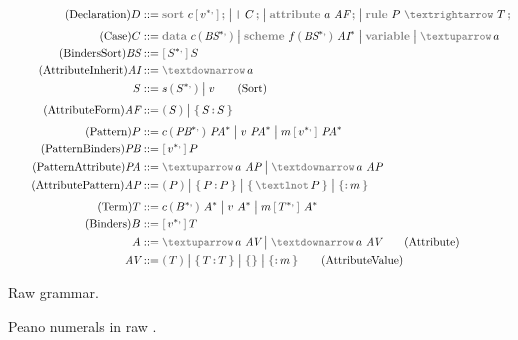 \documentclass[letterpaper,11pt]{article}
\begin{document}
\begin{figure*}[p]
  \begin{align}
    \tag{Declaration}
    D &::= \kw{sort}~c\,\kw[\,v^{*\kw,}\,\kw]\,\kw;
    \bigm| \kw{\texttt{|}}~C\,\kw;
    \bigm| \kw{attribute}~a~\set{AF}\,\kw;
    \bigm| \kw{rule}~P~\kw{$→$}~T\,\kw;
    \\[\jot]
    \tag{Case}
    C &::= \kw{data}~c\,\kw(\,\set{BS}^{*\kw,}\,\kw)
    \bigm| \kw{scheme}~f\,\kw(\,\set{BS}^{*\kw,}\,\kw)~\set{AI}^*
    \bigm| \kw{variable}
    \bigm| \kw{$↑$}\,a
    \\
    \tag{BindersSort}
    \set{BS} &::= \kw[\,S^{*\kw,}\,\kw]\,S
    \\
    \tag{AttributeInherit}
    \set{AI} &::= \kw{$↓$}\,a
    \\
    S &::= s\,\kw(\,S^{*\kw,}\,\kw)
    \bigm| v
    \tag{Sort}
    \\[\jot]
    \tag{AttributeForm}
    \set{AF} &::= \kw(\,S\,\kw)
    \bigm| \kw\{\,S\,\kw:\,S\,\kw\}
    \\[\jot]
    \tag{Pattern}
    P &::= c\,\kw(\,\set{PB}^{*\kw,}\,\kw)~\set{PA}^*
    \bigm| v ~ \set{PA}^*
    \bigm| m\,\kw[\,v^{*\kw,}\,\kw]~\set{PA}^*
    \\
    \tag{PatternBinders}
    \set{PB} &::= \kw[\,v^{*\kw,}\,\kw]\,P
    \\
    \tag{PatternAttribute}
    \set{PA} &::= \kw{$↑$}\,a~\set{AP}
    \bigm| \kw{$↓$}\,a~\set{AP}
    \\
    \tag{AttributePattern}
    \set{AP} &::= \kw(\,P\,\kw)
    \bigm| \kw\{\,P\,\kw:\,P\,\kw\}
    \bigm| \kw\{\,\kw{$¬$}\,P\,\kw\}
    \bigm| \kw\{\kw:\,m\,\kw\}
    \\[\jot]
    \tag{Term}
    T &::= c\,\kw(\,B^{*\kw,}\,\kw)~A^*
    \bigm| v ~ A^*
    \bigm| m\,\kw[\,T^{*\kw,}\,\kw]~A^*
    \\
    \tag{Binders}
    B &::= \kw[\,v^{*\kw,}\,\kw]\,T
    \\
    A &::= \kw{$↑$}\,a~\set{AV}
    \bigm| \kw{$↓$}\,a~\set{AV}
    \tag{Attribute}
    \\
    \set{AV} &::= \kw(\,T\,\kw)
    \bigm| \kw\{\,T\,\kw:\,T\,\kw\}
    \bigm| \kw\{\kw\}
    \bigm| \kw\{\kw:\,m\,\kw\}
    \tag{AttributeValue}
  \end{align}
  \caption{Raw \HAX grammar.}
  \label{fig:hacs}

  \vspace{1em}
  \caption{Peano numerals in raw \HAX.}
  \label{fig:peano}


\end{figure*}
\end{document}
